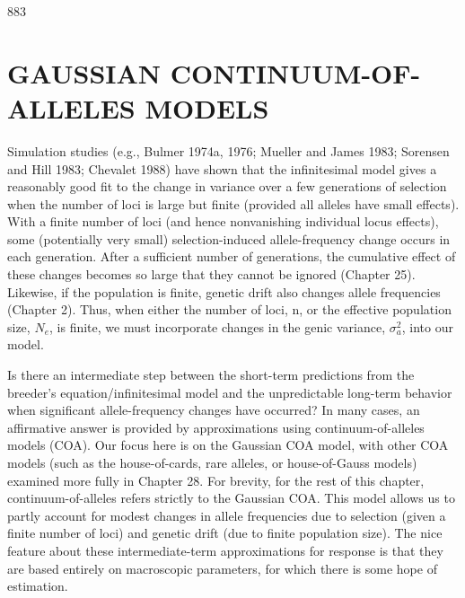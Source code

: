 \documentclass{article}
\begin{document}
883

\section{GAUSSIAN CONTINUUM-OF-ALLELES MODELS}
Simulation studies (e.g., Bulmer 1974a, 1976; Mueller and James 1983; Sorensen and Hill 1983; Chevalet 1988) have shown that the infinitesimal model gives a reasonably good fit to the change in variance over a few generations of selection when the number of loci is large but finite (provided all alleles have small effects). With a finite number of loci (and hence nonvanishing individual locus effects), some (potentially very small) selection-induced allele-frequency change occurs in each generation. After a sufficient number of generations, the cumulative effect of these changes becomes so large that they cannot be ignored (Chapter 25). Likewise, if the population is finite, genetic drift also changes allele frequencies (Chapter 2). Thus, when either the number of loci, n, or the effective population size,  $ N_e $, is finite, we must incorporate changes in the genic variance,  $ \sigma_a^2 $, into our model.

Is there an intermediate step between the short-term predictions from the breeder's equation/infinitesimal model and the unpredictable long-term behavior when significant allele-frequency changes have occurred? In many cases, an affirmative answer is provided by approximations using continuum-of-alleles models (COA). Our focus here is on the Gaussian COA model, with other COA models (such as the house-of-cards, rare alleles, or house-of-Gauss models) examined more fully in Chapter 28. For brevity, for the rest of this chapter, continuum-of-alleles refers strictly to the Gaussian COA. This model allows us to partly account for modest changes in allele frequencies due to selection (given a finite number of loci) and genetic drift (due to finite population size). The nice feature about these intermediate-term approximations for response is that they are based entirely on macroscopic parameters, for which there is some hope of estimation.
\end{document}
